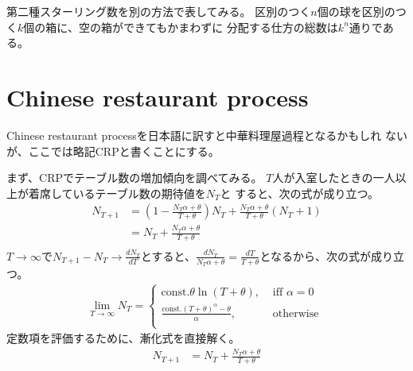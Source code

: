 	第二種スターリング数を別の方法で表してみる。
	区別のつく$n$個の球を区別のつく$k$個の箱に、空の箱ができてもかまわずに
	分配する仕方の総数は$k^n$通りである。

\section{Chinese restaurant process}\label{s1:Chinese restaurant process} %
	Chinese restaurant processを日本語に訳すと中華料理屋過程となるかもしれ
	ないが、ここでは略記CRPと書くことにする。

	まず、CRPでテーブル数の増加傾向を調べてみる。
	$T$人が入室したときの一人以上が着席しているテーブル数の期待値を$N_T$と
	すると、次の式が成り立つ。
	\begin{equation*}\begin{split} %
		N_{T+1} & = (1-\frac{N_T\alpha+\theta}{T+\theta})N_T
			+ \frac{N_T\alpha+\theta}{T+\theta}(N_T+1) \\
		& = N_T + \frac{N_T\alpha+\theta}{T+\theta} \\
	\end{split}\end{equation*} %
	$T\to\infty$で$N_{T+1}-N_T\to \frac{dN_T}{dT}$とすると、$
		\frac{dN_T}{N_T\alpha+\theta} = \frac{dT}{T+\theta}
	$となるから、次の式が成り立つ。
	\begin{equation*}\begin{split} %
		\lim_{T\to\infty}N_T = \begin{cases}
			\text{const.}\theta\ln(T+\theta), &\text{ iff }\alpha=0 \\
			\frac{\text{const.}(T+\theta)^\alpha-\theta}{\alpha}, &\text{ otherwise } \\
		\end{cases}
	\end{split}\end{equation*} %
	定数項を評価するために、漸化式を直接解く。
	\begin{equation*}\begin{split} %
		N_{T+1} & = N_T + \frac{N_T\alpha+\theta}{T+\theta} \\
	\end{split}\end{equation*} %

